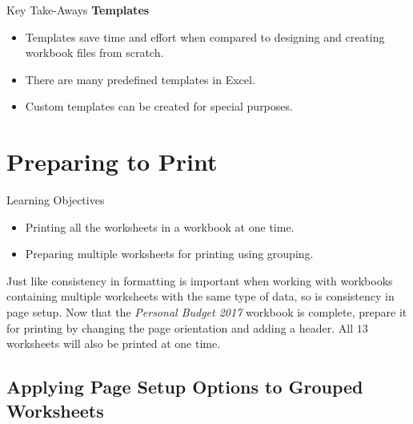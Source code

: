 \begin{center}
	\begin{tkwbox}{Key Take-Aways}
		\textbf{Templates}
		\\
		\begin{itemize}
			\setlength{\itemsep}{0pt}
			\setlength{\parskip}{0pt}
			\setlength{\parsep}{0pt}
			
			\item Templates save time and effort when compared to designing and creating workbook files from scratch.
			\item There are many predefined templates in Excel.
			\item Custom templates can be created for special purposes.
			
		\end{itemize}
	\end{tkwbox}
\end{center}

\section{Preparing to Print}

\begin{center}
	\begin{objbox}{Learning Objectives}
		\begin{itemize}
			\setlength{\itemsep}{0pt}
			\setlength{\parskip}{0pt}
			\setlength{\parsep}{0pt}
			
			\item Printing all the worksheets in a workbook at one time.
			\item Preparing multiple worksheets for printing using grouping.
			
		\end{itemize}
	\end{objbox}
\end{center}

Just like consistency in formatting is important when working with workbooks containing multiple worksheets with the same type of data, so is consistency in page setup. Now that the \textit{Personal Budget 2017} workbook is complete, prepare it for printing by changing the page orientation and adding a header. All $ 13 $ worksheets will also be printed at one time.

\subsection{Applying Page Setup Options to Grouped Worksheets}

